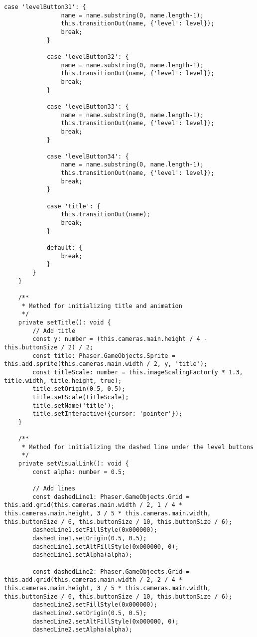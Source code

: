 \begin{lstlisting}[style=TypeScript, caption={levelMenuScene.ts}]
            case 'levelButton31': {
                name = name.substring(0, name.length-1);
                this.transitionOut(name, {'level': level});
                break;
            }

            case 'levelButton32': {
                name = name.substring(0, name.length-1);
                this.transitionOut(name, {'level': level});
                break;
            }

            case 'levelButton33': {
                name = name.substring(0, name.length-1);
                this.transitionOut(name, {'level': level});
                break;
            }

            case 'levelButton34': {
                name = name.substring(0, name.length-1);
                this.transitionOut(name, {'level': level});
                break;
            }

            case 'title': {
                this.transitionOut(name);
                break;
            }

            default: {
                break;
            }
        }
    }

    /**
     * Method for initializing title and animation
     */
    private setTitle(): void {
        // Add title
        const y: number = (this.cameras.main.height / 4 - this.buttonSize / 2) / 2;
        const title: Phaser.GameObjects.Sprite = this.add.sprite(this.cameras.main.width / 2, y, 'title');
        const titleScale: number = this.imageScalingFactor(y * 1.3, title.width, title.height, true);
        title.setOrigin(0.5, 0.5);
        title.setScale(titleScale);
        title.setName('title');
        title.setInteractive({cursor: 'pointer'});
    }

    /**
     * Method for initializing the dashed line under the level buttons
     */
    private setVisualLink(): void {
        const alpha: number = 0.5;

        // Add lines
        const dashedLine1: Phaser.GameObjects.Grid = this.add.grid(this.cameras.main.width / 2, 1 / 4 * this.cameras.main.height, 3 / 5 * this.cameras.main.width, this.buttonSize / 6, this.buttonSize / 10, this.buttonSize / 6);
        dashedLine1.setFillStyle(0x000000);
        dashedLine1.setOrigin(0.5, 0.5);
        dashedLine1.setAltFillStyle(0x000000, 0);
        dashedLine1.setAlpha(alpha);

        const dashedLine2: Phaser.GameObjects.Grid = this.add.grid(this.cameras.main.width / 2, 2 / 4 * this.cameras.main.height, 3 / 5 * this.cameras.main.width, this.buttonSize / 6, this.buttonSize / 10, this.buttonSize / 6);
        dashedLine2.setFillStyle(0x000000);
        dashedLine2.setOrigin(0.5, 0.5);
        dashedLine2.setAltFillStyle(0x000000, 0);
        dashedLine2.setAlpha(alpha);


\end{lstlisting}
